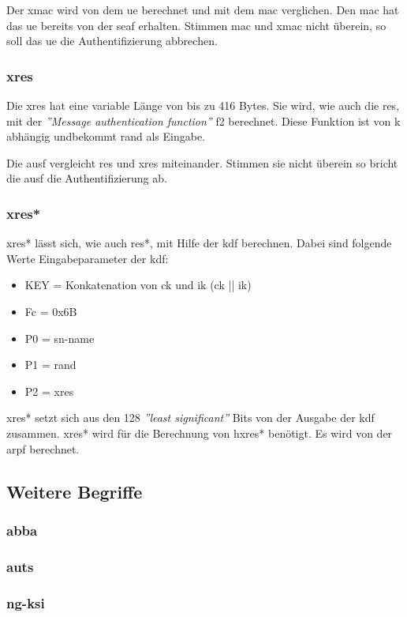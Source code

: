 Der \gls{xmac} wird von dem \gls{ue} berechnet und mit dem \gls{mac} verglichen. 
Den \gls{mac} hat das \gls{ue} bereits von der \gls{seaf} erhalten.
Stimmen \gls{mac} und \gls{xmac} nicht \"uberein, so soll das \gls{ue} die Authentifizierung abbrechen. %

\subsubsection{\gls{xres}}
Die \gls{xres} hat eine variable L\"ange von bis zu 416 Bytes. %
Sie wird, wie auch die \gls{res}, mit der \textit{''Message authentication function''} f2 berechnet. 
Diese Funktion ist von \gls{k} abh\"angig undbekommt \gls{rand} als Eingabe. %

Die \gls{ausf} vergleicht \gls{res} und \gls{xres} miteinander.
Stimmen sie nicht \"uberein so bricht die \gls{ausf} die Authentifizierung ab. %

\subsubsection{\gls{xres*}}
\gls{xres*} l\"asst sich, wie auch \gls{res*}, mit Hilfe der \gls{kdf} berechnen.
Dabei sind folgende Werte Eingabeparameter der \gls{kdf}: %
\begin{itemize}
\item KEY = Konkatenation von \gls{ck} und \gls{ik} (\gls{ck} || \gls{ik})
\item Fc = 0x6B
\item P0 = \gls{sn-name}
\item P1 = \gls{rand}
\item P2 = \gls{xres}
\end{itemize}

\gls{xres*} setzt sich aus den 128 \textit{''least significant''} Bits von der Ausgabe der \gls{kdf} zusammen.
\gls{xres*} wird f\"ur die Berechnung von \gls{hxres*} ben\"otigt.
Es wird von der \gls{arpf} berechnet.





\subsection{Weitere Begriffe}

\subsubsection{\gls{abba}}

\subsubsection{\gls{auts}}

\subsubsection{\gls{ng-ksi}}
















